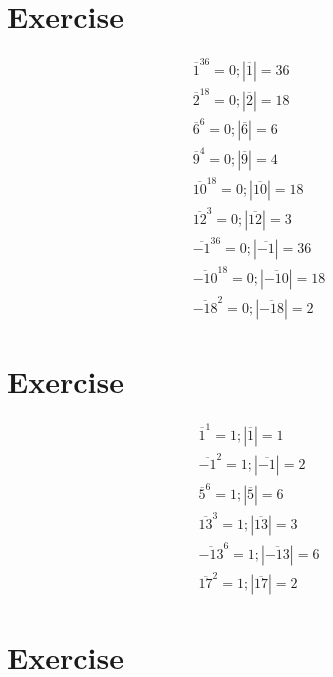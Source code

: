 \documentclass{article}
\begin{document}
\section{Exercise}
\begin{align*}
    \overline{1}^{36} = 0; |\overline{1}| = 36 \\
    \overline{2}^{18} = 0; |\overline{2}| = 18 \\
    \overline{6}^{6} = 0; |\overline{6}| = 6 \\
    \overline{9}^{4} = 0; |\overline{9}| = 4 \\
    \overline{10}^{18} = 0; |\overline{10}| = 18 \\
    \overline{12}^{3} = 0; |\overline{12}| = 3 \\
    \overline{-1}^{36} = 0; |\overline{-1}| = 36 \\
    \overline{-10}^{18} = 0; |\overline{-10}| = 18 \\
    \overline{-18}^{2} = 0; |\overline{-18}| = 2
\end{align*}
\section{Exercise}
\begin{align*}
    \overline{1}^{1} = 1; |\overline{1}| = 1 \\
    \overline{-1}^{2} = 1; |\overline{-1}| = 2 \\
    \overline{5}^{6} = 1; |\overline{5}| = 6 \\
    \overline{13}^{3} = 1; |\overline{13}| = 3 \\
    \overline{-13}^{6} = 1; |\overline{-13}| = 6\\
    \overline{17}^{2} = 1; |\overline{17}| = 2
\end{align*}
\section{Exercise}
\end{document}
